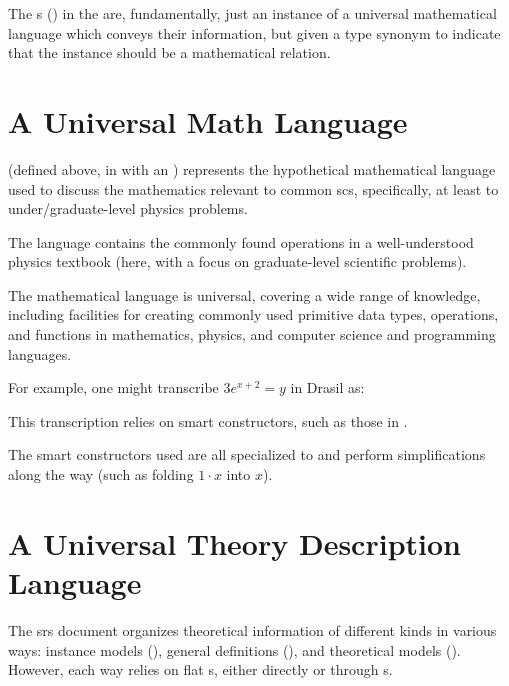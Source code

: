 \originalRelationConcept{}

The \Relation{}s () in the \RelationConcept{} are,
fundamentally, just an instance of a universal mathematical language which
conveys their information, but given a type synonym to indicate that the
instance should be a mathematical relation.





\section{A Universal Math Language}
\label{sec:modelkinds:language}




\originalExprHaskell




\Expr{} (defined above, in  with an )
represents the hypothetical mathematical language used to discuss the
mathematics relevant to common \acs{scs}, specifically, at least to
under/graduate-level physics problems.

The language contains the commonly found operations in a well-understood physics
textbook (here, with a focus on graduate-level scientific problems).

The mathematical language is universal, covering a wide range of knowledge,
including facilities for creating commonly used primitive data types,
operations, and functions  in mathematics, physics, and computer science and
programming languages.

For example, one might transcribe \(3 e^{x + 2} = y\) in Drasil as:

\pseudoExampleExpression{}

This transcription relies on smart constructors, such as those in
.

The smart constructors used are all specialized to \Expr{} and perform
simplifications along the way (such as folding \(1 \cdot x\) into \(x\)).




\section{A Universal Theory Description Language}



The \acs{srs} document organizes theoretical information of different kinds in
various ways: instance models (\InstanceModel{}), general definitions
(\GenDefn{}), and theoretical models (\TheoryModel{}). However, each way relies
on flat \Relation{}s, either directly or through \RelationConcept{}s.

